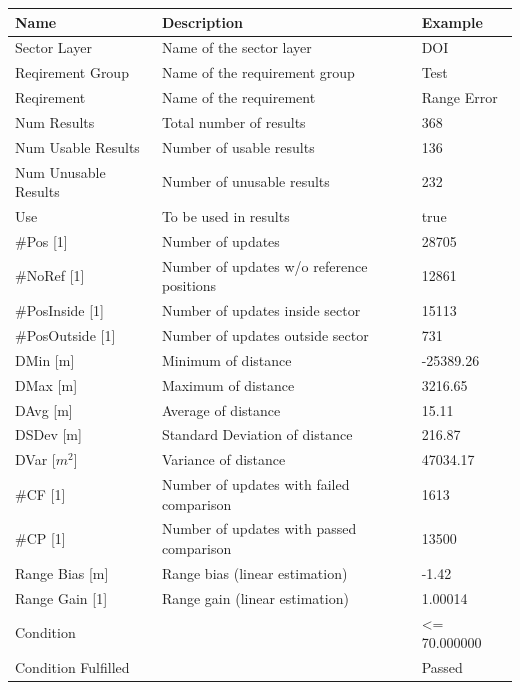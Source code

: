 \begin{center}
 \begin{table}[H]
  \begin{tabularx}{\textwidth}{ | l | X |  l | }
    \hline
    \textbf{Name} & \textbf{Description} & \textbf{Example} \\ \hline
  Sector Layer & Name of the sector layer & DOI \\ \hline
  Reqirement Group & Name of the requirement group & Test \\ \hline
  Reqirement & Name of the requirement & Range Error \\ \hline
  Num Results & Total number of results & 368 \\ \hline
  Num Usable Results & Number of usable results & 136 \\ \hline
  Num Unusable Results & Number of unusable results & 232 \\ \hline
  Use & To be used in results & true \\ \hline
  \#Pos [1] & Number of updates & 28705 \\ \hline
  \#NoRef [1] & Number of updates w/o reference positions & 12861 \\ \hline
  \#PosInside [1] & Number of updates inside sector & 15113 \\ \hline
  \#PosOutside [1] & Number of updates outside sector & 731 \\ \hline
  DMin [m] & Minimum of distance & -25389.26 \\ \hline
  DMax [m] & Maximum of distance & 3216.65 \\ \hline
  DAvg [m] & Average of distance & 15.11 \\ \hline
  DSDev [m] & Standard Deviation of distance & 216.87 \\ \hline
  DVar [$m^2$] & Variance of distance & 47034.17 \\ \hline
  \#CF [1] & Number of updates with failed comparison & 1613 \\ \hline
  \#CP [1] & Number of updates with passed comparison  & 13500 \\ \hline
  Range Bias [m] & Range bias (linear estimation) & -1.42 \\ \hline
  Range Gain [1] & Range gain (linear estimation) & 1.00014 \\ \hline
  Condition &  & <= 70.000000 \\ \hline
  Condition Fulfilled &  & Passed \\ \hline

\end{tabularx}
\end{table}
\end{center}

